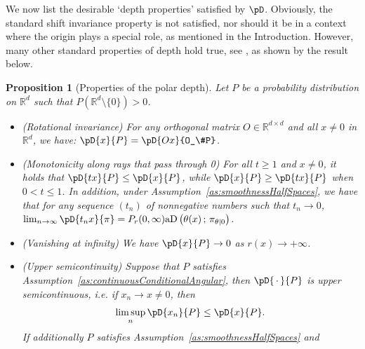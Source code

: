 \documentclass{article}
\numberwithin{equation}{section}
\newtheorem{proposition}{Proposition}[section]
\newcommand{\rset}{\mathbb{R}}
\newcommand{\point}{\,\cdot\,}
\newcommand{\coD}[2]{\pD{#1}{#2}}
\newcommand{\aD}[2]{{\mathrm{aD}}\left({#1}\,;\,{#2}\right)}
\newcommand{\PropRotationalInvarianceCODText}{$\textbf{D'}_1$}  %
\newcommand{\PropMonotonocityCODText}{$\textbf{D}_3$}  %
\newcommand{\PropVanishingInfCODText}{$\textbf{D}_4$}  %
\newcommand{\PropUpperSemContCODText}{$\textbf{D}_5$}  %
\begin{document}

We now list the desirable `depth properties' satisfied by $\pD$.
Obviously, the standard shift invariance property is not satisfied,
nor should it be in a context where the origin plays a special role,
as mentioned in the Introduction. However, many other standard
properties of depth hold true, see \cite{ZuoS00a,ZuoS00b}, as shown by the result below.

\begin{proposition}[Properties of the polar depth]\label{prop:main_properties}
    Let \(P\) be a probability distribution on \(\rset^d\) such that $P(\rset^d\setminus\{0\})>0$.
    \begin{itemize}
        \item[\PropRotationalInvarianceCODText]\label{prop:PropRotationalInvarianceCOD}
            {\sc (Rotational invariance)} For
            any orthogonal matrix \(O\in\rset^{d\times d}\) and all $x\neq 0$ in $\mathbb{R}^d$, we have: \(\coD{x}{P}=\coD{Ox}{O_\#P}\). %
        \item[\PropMonotonocityCODText]\label{prop:PropMonotonocityCOD}
            {\sc (Monotonicity along rays that pass through 0)} For
            all \(t\geq 1\) and $x\neq 0$, it holds that \(\coD{tx}{P}\leq \coD{x}{P}\),
            while
            \(\coD{x}{P}\geq\coD{tx}{P}\) when \(0<t\leq 1\). In addition, 
            under Assumption~\ref{as:smoothnessHalfSpaces}, we have
            that for any sequence $(t_n)$ of nonnegative numbers such
            that $t_n\to 0$,
            \(\lim_{n\to\infty}\coD{t_nx}{\pi}=P_r(0,\infty)\aD{\theta(x)}{\pi_{\theta|0}}\).
        \item[\PropVanishingInfCODText]\label{prop:VanishingInfCOD} {\sc
            (Vanishing at infinity)} We have \(\coD{x}{P}\to 0\)
            as \(r(x)\to +\infty\).
        \item[\PropUpperSemContCODText]\label{prop:PropUpperSemContCOD}
            {\sc (Upper semicontinuity)} Suppose that $P$ satisfies
            Assumption~\ref{as:continuousConditionalAngular}, then \(\coD{\point}{P}\) is upper semicontinuous, i.e.
            if \(x_n\to x\neq 0\), then
            \begin{equation*}
                \limsup_n{\coD{x_n}{P}}\leq \coD{x}{P}.
            \end{equation*}
            If additionally $P$ satisfies Assumption~\ref{as:smoothnessHalfSpaces} and %

\end{itemize}
\end{proposition}
\end{document}
